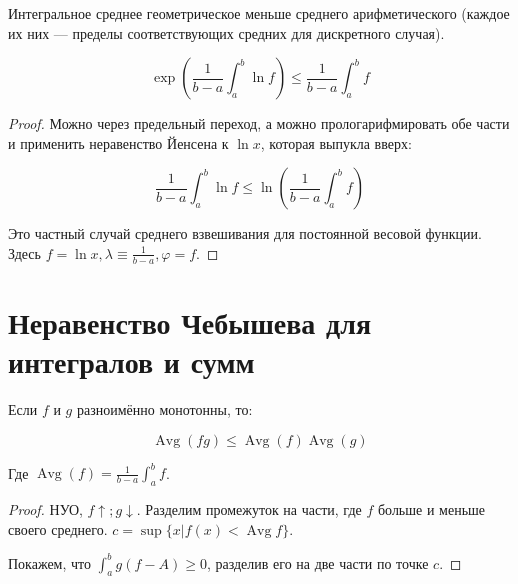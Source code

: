 \documentclass[12pt, a4paper]{article}
\begin{document}
    \begin{theorem}

        Интегральное среднее геометрическое меньше среднего арифметического (каждое их них — пределы соответствующих средних для дискретного случая).
        
        \begin{equation}
            \exp \left(\frac{1}{b - a}\int^b_a \ln f\right) \leqslant \frac{1}{b - a}\int^b_a f
        \end{equation}

        \begin{proof}
            Можно через предельный переход, а можно прологарифмировать обе части и применить неравенство Йенсена к $\ln x$, которая выпукла вверх:

            \begin{equation}
                \frac{1}{b - a}\int^b_a \ln f \leqslant \ln \left( \frac{1}{b - a}\int^b_a f \right)
            \end{equation}

            Это частный случай среднего взвешивания для постоянной весовой функции.
            Здесь $f = \ln x, \lambda \equiv \frac{1}{b - a}, \varphi = f$.
        \end{proof}
    \end{theorem}
    

\section{Неравенство Чебышева для интегралов и сумм}

    \begin{theorem}
        
        Если $f$ и $g$ разноимённо монотонны, то:

        \begin{equation}
            \operatorname{Avg}(fg) \leqslant \operatorname{Avg}(f) \operatorname{Avg}(g)
        \end{equation}
        
        Где $\operatorname{Avg}(f) = \frac{1}{b - a}\int^b_a f$.

        \begin{proof}
            НУО, $f \uparrow; g \downarrow$.
            Разделим промежуток на части, где $f$ больше и меньше своего среднего.
            $c = \sup \{x | f(x) < \operatorname{Avg} f\}$.

            Покажем, что $\int^b_a g (f - A) \geqslant 0$, разделив его на две части по точке $c$.
        \end{proof}
    \end{theorem}
\end{document}
